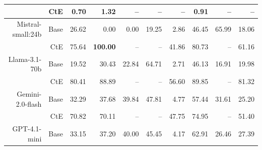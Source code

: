 \begin{table}[!t]
\begin{tabular}{r r !{\color{white!80!black} \vline} r r r r r !{\color{white!80!black} \vline} r r r}
 & CtE & \textcolor{blue!60!black}{0.70} & \textcolor{blue!60!black}{1.32} & \textcolor{blue!60!black}{--} & \textcolor{blue!60!black}{--} & \textcolor{blue!60!black}{--} & \textcolor{blue!60!black}{0.91} & \textcolor{blue!60!black}{--} & \textcolor{blue!60!black}{--} \\ \midrule
 \sf Mistral-small:24b & Base & \textcolor{blue!60!black}{26.62} & 0.00 & \textcolor{blue!60!black}{0.00} & \textcolor{blue!60!black}{19.25} & \textcolor{blue!60!black}{2.86} & \textcolor{blue!60!black}{46.45} & \textcolor{blue!60!black}{65.99} & \textcolor{blue!60!black}{18.06} \\
 & CtE & \textcolor{blue!60!black}{75.64} & \textbf{100.00} & \textcolor{blue!60!black}{--} & \textcolor{blue!60!black}{--} & \textcolor{blue!60!black}{41.86} & \textcolor{blue!60!black}{80.73} & \textcolor{blue!60!black}{--} & \textcolor{blue!60!black}{61.16} \\ \midrule
 \sf Llama-3.1-70b & Base & \textcolor{blue!60!black}{19.52} & 30.43 & \textcolor{blue!60!black}{22.84} & \textcolor{blue!60!black}{64.71} & \textcolor{blue!60!black}{2.71} & \textcolor{blue!60!black}{46.13} & \textcolor{blue!60!black}{16.91} & \textcolor{blue!60!black}{19.98} \\
 & CtE & \textcolor{blue!60!black}{80.41} & \textcolor{blue!60!black}{88.89} & \textcolor{blue!60!black}{--} & \textcolor{blue!60!black}{--} & \textcolor{blue!60!black}{56.60} & \textcolor{blue!60!black}{89.85} & \textcolor{blue!60!black}{--} & \textcolor{blue!60!black}{81.32} \\ \midrule
 \sf Gemini-2.0-flash & Base & \textcolor{blue!60!black}{32.29} & \textcolor{blue!60!black}{37.68} & \textcolor{blue!60!black}{39.84} & \textcolor{blue!60!black}{47.81} & \textcolor{blue!60!black}{4.77} & \textcolor{blue!60!black}{57.44} & \textcolor{blue!60!black}{31.61} & \textcolor{blue!60!black}{25.20} \\
 & CtE & \textcolor{blue!60!black}{70.82} & \textcolor{blue!60!black}{70.11} & \textcolor{blue!60!black}{--} & \textcolor{blue!60!black}{--} & \textcolor{blue!60!black}{47.75} & \textcolor{blue!60!black}{74.95} & \textcolor{blue!60!black}{--} & \textcolor{blue!60!black}{51.40} \\ \midrule
 \sf GPT-4.1-mini & Base & \textcolor{blue!60!black}{33.15} & \textcolor{blue!60!black}{37.20} & \textcolor{blue!60!black}{40.00} & \textcolor{blue!60!black}{45.45} & \textcolor{blue!60!black}{4.17} & \textcolor{blue!60!black}{62.91} & \textcolor{blue!60!black}{26.46} & \textcolor{blue!60!black}{27.39} \\

\end{tabular}
\end{table}
